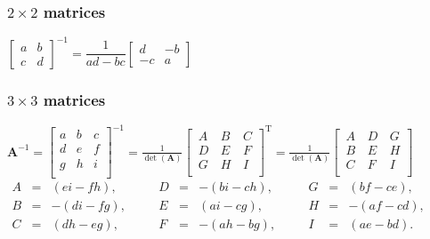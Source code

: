 \subsubsection{$2\times2$ matrices}
$\begin{bmatrix}
	a & b\\c & d
\end{bmatrix}^{-1}=\dfrac{1}{ad-bc}\begin{bmatrix}
	d & -b\\-c & a
\end{bmatrix}$

\subsubsection{$3\times3$ matrices}
$\mathbf {A} ^{-1}={\begin{bmatrix}a&b&c\\d&e&f\\g&h&i\\\end{bmatrix}}^{-1}={\frac {1}{\det(\mathbf {A} )}}{\begin{bmatrix}\,A&\,B&\,C\\\,D&\,E&\,F\\\,G&\,H&\,I\\\end{bmatrix}}^{\mathrm {T} }={\frac {1}{\det(\mathbf {A} )}}{\begin{bmatrix}\,A&\,D&\,G\\\,B&\,E&\,H\\\,C&\,F&\,I\\\end{bmatrix}}$\\
$\begin{alignedat}{6}A&={}&(ei-fh),&\quad &D&={}&-(bi-ch),&\quad &G&={}&(bf-ce),\\B&={}&-(di-fg),&\quad &E&={}&(ai-cg),&\quad &H&={}&-(af-cd),\\C&={}&(dh-eg),&\quad &F&={}&-(ah-bg),&\quad &I&={}&(ae-bd).\\\end{alignedat}$


